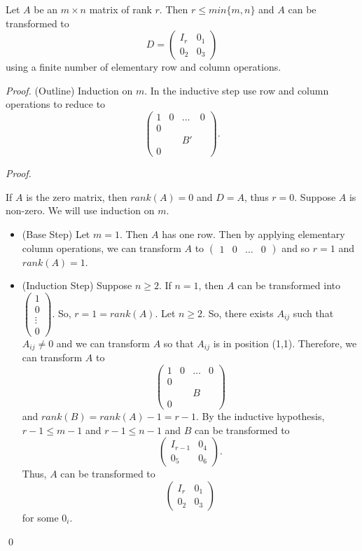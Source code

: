 \documentclass[12pt]{article}
\newenvironment{theorem}[2][Theorem]{\begin{trivlist}
\item[\hskip \labelsep {\bfseries #1}\hskip \labelsep {\bfseries #2.}]}{\end{trivlist}}
\newenvironment{sol}
    {\emph{Proof.}
    }
    {
    \qed
    }
\begin{document}
\begin{theorem}{3.6}
Let $A$ be an $m \times n$ matrix of rank $r$. Then $r \leq min\{m, n\}$ and $A$ can be transformed to $$D = \begin{pmatrix}
I_r & 0_1 \\
0_2 & 0_3
\end{pmatrix}$$ using a finite number of elementary row and column operations.
\end{theorem}

\textit{Proof.} (Outline)
Induction on $m$. In the inductive step use row and column operations to reduce to
$$\left(\begin{array}{c|ccc}
1 & 0 & \ldots & 0 \\
\hline 
0 & & & \\
& & B' & \\
0 & & &
\end{array}\right).$$

\begin{sol}
If $A$ is the zero matrix, then $rank(A) = 0$ and $D = A$, thus $r = 0$. Suppose $A$ is non-zero. We will use induction on $m$.
\begin{itemize}
    \item[](Base Step) Let $m = 1$. Then $A$ has one row. Then by applying elementary column operations, we can transform $A$ to $\begin{pmatrix}
    1 & 0 & \dots & 0
    \end{pmatrix}$ and so $r = 1$ and $rank(A) = 1$.
    
    \item[](Induction Step) Suppose $n \geq 2$. If $n = 1$, then $A$ can be transformed into $\begin{pmatrix}
    1 \\ 0 \\ \vdots \\ 0
    \end{pmatrix}$. So, $r = 1 = rank(A)$. Let $n \geq 2$. So, there exists $A_{ij}$ such that $A_{ij} \neq 0$ and we can transform $A$ so that $A_{ij}$ is in position (1,1). Therefore, we can transform $A$ to $$\left(\begin{array}{c|ccc}
1 & 0 & \ldots & 0 \\
\hline 
0 & & & \\
& & B & \\
0 & & &
\end{array}\right)$$ and $rank(B) = rank(A) - 1 = r - 1$. By the inductive hypothesis, $r - 1 \leq m - 1$ and $r - 1 \leq n - 1$ and $B$ can be transformed to $$\begin{pmatrix}
I_{r-1} & 0_4 \\ 0_5 & 0_6
\end{pmatrix}.$$ Thus, $A$ can be transformed to $$\begin{pmatrix}
I_r & 0_1 \\ 0_2 & 0_3
\end{pmatrix}$$ for some $0_i$.
    \end{itemize}
\end{sol}
\end{document}
